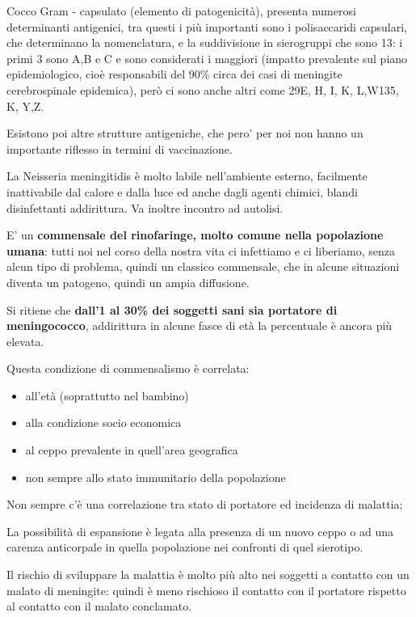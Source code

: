   Cocco Gram - capsulato (elemento di patogenicità), presenta numerosi
  determinanti antigenici, tra questi i più importanti sono i
  polisaccaridi capsulari, che determinano la nomenclatura, e la
  suddivisione in sierogruppi che sono 13: i primi 3 sono A,B e C e sono
  considerati i maggiori (impatto prevalente sul piano epidemiologico,
  cioè responsabili del 90\% circa dei casi di meningite cerebrospinale
  epidemica), però ci sono anche altri come 29E, H, I, K, L,W135, K,
  Y,Z.

  Esistono poi altre strutture antigeniche, che pero' per noi non hanno
  un importante riflesso in termini di vaccinazione.

  La Neisseria meningitidis è molto labile nell'ambiente esterno,
  facilmente inattivabile dal calore e dalla luce ed anche dagli agenti
  chimici, blandi disinfettanti addirittura. Va inoltre incontro ad
  autolisi.

  E' un \textbf{commensale del rinofaringe, molto comune nella
  popolazione umana}: tutti noi nel corso della nostra vita ci
  infettiamo e ci liberiamo, senza alcun tipo di problema, quindi un
  classico commensale, che in alcune situazioni diventa un patogeno,
  quindi un ampia diffusione.

  Si ritiene che \textbf{dall'1 al 30\% dei soggetti sani sia portatore
  di meningococco}, addirittura in alcune fasce di età la percentuale è
  ancora più elevata.

  Questa condizione di commensalismo è correlata:
  \begin{itemize}
  
\item
  all'età (soprattutto nel bambino)
\item
  alla condizione socio economica
\item
  al ceppo prevalente in quell'area geografica
\item
  non sempre allo stato immunitario della popolazione
\end{itemize}
  Non sempre c'è una correlazione tra stato di portatore ed incidenza di
  malattia;

  La possibilità di espansione è legata alla presenza di un nuovo ceppo
  o ad una carenza anticorpale in quella popolazione nei confronti di
  quel sierotipo.

  Il rischio di sviluppare la malattia è molto più alto nei soggetti a
  contatto con un malato di meningite: quindi è meno rischioso il
  contatto con il portatore rispetto al contatto con il malato
  conclamato.

